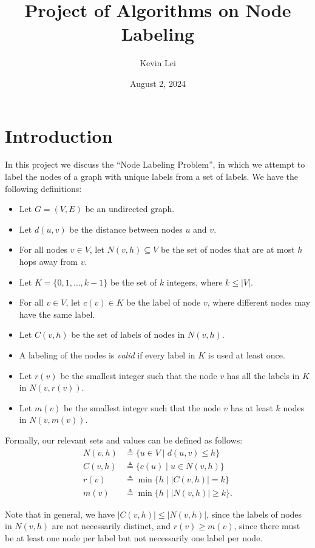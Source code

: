 \documentclass{article}
\title{Project of Algorithms on Node Labeling}
\author{Kevin Lei}
\date{August 2, 2024}
\begin{document}
\maketitle

\section{Introduction}

In this project we discuss the ``Node Labeling Problem'', in which we attempt to label the nodes of a graph with unique labels from a set of labels.
We have the following definitions:
\begin{itemize}
    \item Let $G = (V, E)$ be an undirected graph.
    \item Let $d(u, v)$ be the distance between nodes $u$ and $v$.
    \item For all nodes $v \in V$, let $N(v, h) \subseteq V$ be the set of nodes that are at most $h$ hops away from $v$.
    \item Let $K = \{0, 1, \ldots, k-1\}$ be the set of $k$ integers, where $k \leq |V|$.
    \item For all $v \in V$, let $c(v) \in K$ be the label of node $v$, where different nodes may have the same label.
    \item Let $C(v, h)$ be the set of labels of nodes in $N(v, h)$.
    \item A labeling of the nodes is \textit{valid} if every label in $K$ is used at least once.
    \item Let $r(v)$ be the smallest integer such that the node $v$ has all the labels in $K$ in $N(v, r(v))$.
    \item Let $m(v)$ be the smallest integer such that the node $v$ has at least $k$ nodes in $N(v, m(v))$.
\end{itemize}

Formally, our relevant sets and values can be defined as follows:
\begin{align*}
    N(v, h) &\triangleq \{u \in V \mid d(u, v) \leq h\} \\
    C(v, h) &\triangleq \{c(u) \mid u \in N(v, h)\} \\
    r(v) &\triangleq \min\{h \mid |C(v, h)| = k\} \\
    m(v) &\triangleq \min\{h \mid |N(v, h)| \geq k\}.
\end{align*}

Note that in general, we have $|C(v, h)| \leq |N(v, h)|$, since the labels of nodes in $N(v, h)$ are not necessarily distinct, 
and $r(v) \geq m(v)$, since there must be at least one node per label but not necessarily one label per node.
\end{document}
